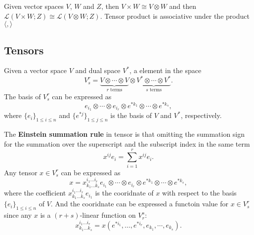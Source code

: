 \begin{theorem}
Given vector spaces $V$, $W$ and $Z$, then $V\times W\cong V\otimes W$ and then $\mathcal{L}(V\times W;Z)\cong\mathcal{L}(V\otimes W;Z)$. Tensor product is associative under the product $\langle,\rangle$
\end{theorem}

\subsection{Tensors}
\begin{definition}
Given a vector space $V$ and dual space $V^*$, a element in the space 
\begin{equation}
V^r_s=\underbrace{V\otimes\cdots\otimes V}_{r\text{ terms}}\otimes \underbrace{V^*\otimes\cdots\otimes V^*}_{s\text{ terms}}.
\end{equation}
The basis of $V^r_s$ can be expressed as
\begin{equation}
e_{i_1}\otimes\cdots\otimes e_{i_r}\otimes e^{*k_1}\otimes\cdots\otimes e^{*k_s},
\end{equation}
where $\{e_i\}_{1\le i\le n}$ and $\{e^{*j}\}_{1\le j\le n}$ is the basis of $V$ and $V^*$, respectively. 
\end{definition}

The \textbf{Einstein summation rule} in tensor is that omitting the summation sign for the summation over the superscript and the subscript index in the same term
\begin{equation*}
x^{ij}e_{i}=\sum_{i=1}^rx^{ij}e_i.
\end{equation*}
Any tensor $x\in V^r_s$ can be expressed as
\begin{equation}
x=x^{i_1\dots i_r}_{k_1\dots k_s}e_{i_1}\otimes\cdots\otimes e_{i_r}\otimes e^{*k_1}\otimes\cdots\otimes e^{*k_s},
\end{equation}
where the coefficient $x^{i_1\dots i_r}_{k_1\dots k_s}e_{i_1}$ is the cooridnate of $x$ with respect to the basis $\{e_i\}_{1\le i\le n}$ of $V$. And the cooridnate can be expressed a functoin value for $x\in V^r_s$ since any $x$ is a $(r+s)$-linear function on $V^s_r$:
\begin{equation}
x^{i_1\dots i_r}_{k_1\dots k_s}=x(e^{*i_1},\dots, e^{*i_r},e_{k_1},\cdots, e_{k_s}).
\end{equation}

